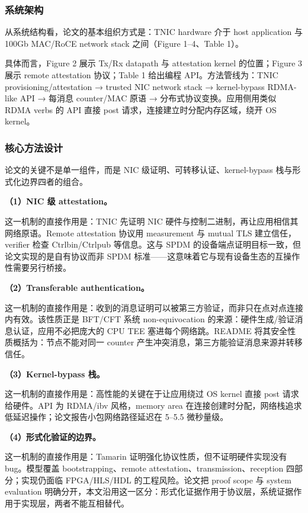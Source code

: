 \documentclass[11pt]{ctexart}
\begin{document}
\subsubsection{系统架构}
从系统结构看，论文的基本组织方式是：TNIC hardware 介于 host application 与 100Gb MAC/RoCE network stack 之间（Figure 1--4、Table 1）。\par
具体而言，Figure 2 展示 Tx/Rx datapath 与 attestation kernel 的位置；Figure 3 展示 remote attestation 协议；Table 1 给出编程 API。方法管线为：TNIC provisioning/attestation → trusted NIC network stack → kernel-bypass RDMA-like API → 每消息 counter/MAC 原语 → 分布式协议变换。应用侧用类似 RDMA verbs 的 API 直接 post 请求，连接建立时分配内存区域，绕开 OS kernel。\par
\subsubsection{核心方法设计}
论文的关键不是单一组件，而是 NIC 级证明、可转移认证、kernel-bypass 栈与形式化边界四者的组合。\par
\noindent\textbf{（1）NIC 级 attestation。}\par
这一机制的直接作用是：TNIC 先证明 NIC 硬件与控制二进制，再让应用相信其网络原语。Remote attestation 协议用 measurement 与 mutual TLS 建立信任，verifier 检查 Ctrlbin/Ctrlpub 等信息。这与 SPDM 的设备端点证明目标一致，但论文实现的是自有协议而非 SPDM 标准——这意味着它与现有设备生态的互操作性需要另行桥接。\par
\noindent\textbf{（2）Transferable authentication。}\par
这一机制的直接作用是：收到的消息证明可以被第三方验证，而非只在点对点连接内有效。该性质正是 BFT/CFT 系统 non-equivocation 的来源：硬件生成/验证消息认证，应用不必把庞大的 CPU TEE 塞进每个网络跳。README 将其安全性质概括为：节点不能对同一 counter 产生冲突消息，第三方能验证消息来源并转移信任。\par
\noindent\textbf{（3）Kernel-bypass 栈。}\par
这一机制的直接作用是：高性能的关键在于让应用绕过 OS kernel 直接 post 请求给硬件。API 为 RDMA/ibv 风格，memory area 在连接创建时分配，网络栈追求低延迟操作；论文报告小包网络路径延迟在 5--5.5 微秒量级。\par
\noindent\textbf{（4）形式化验证的边界。}\par
这一机制的直接作用是：Tamarin 证明强化协议性质，但不证明硬件实现没有 bug。模型覆盖 bootstrapping、remote attestation、transmission、reception 四部分；实现仍面临 FPGA/HLS/HDL 的工程风险。论文把 proof scope 与 system evaluation 明确分开，本文沿用这一区分：形式化证据作用于协议层，系统证据作用于实现层，两者不能互相替代。\par
\end{document}
